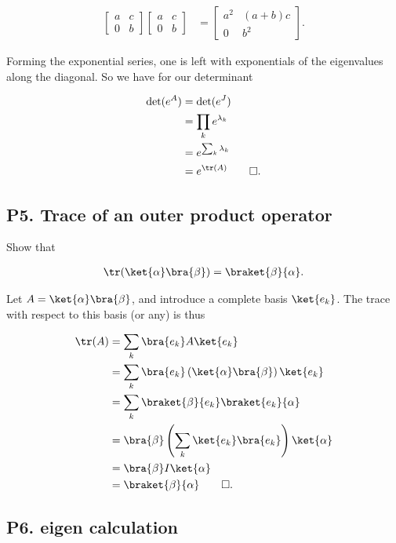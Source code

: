 \begin{align*}
\begin{bmatrix}
a & c \\
0 & b
\end{bmatrix}
\begin{bmatrix}
a & c \\
0 & b
\end{bmatrix}
&=
\begin{bmatrix}
a^2 & (a + b)c \\
0 & b^2
\end{bmatrix}.
\end{align*}

Forming the exponential series, one is left with exponentials of the eigenvalues along the diagonal.  So we have for our determinant

\begin{align*}
\det(e^A) 
&=
\det(e^J) \\
&=
\prod_k e^{\lambda_k} \\
&=
e^{\sum_k \lambda_k} \\
&=
e^{\tr(A)} \qquad \square.
\end{align*}

\subsection{P5. Trace of an outer product operator}

Show that 

\begin{align*}
\tr( \ket{\alpha}\bra{\beta} ) = \braket{\beta}{\alpha}.
\end{align*}

Let $A = \ket{\alpha}\bra{\beta}$, and introduce a complete basis $\ket{e_k}$.  The trace with respect to this basis (or any) is thus

\begin{align*}
\tr(A) 
&= \sum_k \bra{e_k} A \ket{e_k} \\
&= \sum_k \bra{e_k} \left( \ket{\alpha} \bra{\beta} \right) \ket{e_k} \\
&= \sum_k \braket{\beta} {e_k} \braket{e_k} {\alpha} \\
&= \bra{\beta} \left( \sum_k \ket{e_k} \bra{e_k} \right) \ket{\alpha} \\
&= \bra{\beta} I \ket{\alpha} \\
&= \braket{\beta} {\alpha} \qquad \square.
\end{align*}

\subsection{P6. eigen calculation}

